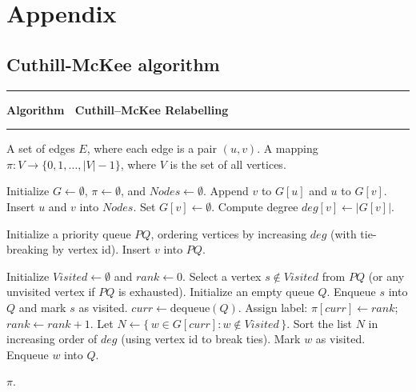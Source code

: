 \chapter{Appendix}

\section{Cuthill-McKee algorithm}\label{sec:cm}

\label{alg:cm_refactored}%

\noindent\rule{\textwidth}{0.8pt}\par
\vspace{-0.3cm}
\noindent\textbf{Algorithm \thealgorithm\ Cuthill--McKee Relabelling}\par
\vspace{-0.5cm}
\noindent\rule{\textwidth}{0.4pt}\par

\begin{algorithmic}[1]
  \Require A set of edges $E$, where each edge is a pair $(u,v)$.
  \Ensure A mapping $\pi : V \to \{0,1,\dots,|V|-1\}$, where $V$ is the set of all vertices.

  \State Initialize $G \leftarrow \emptyset$, $\pi \leftarrow \emptyset$, and $Nodes \leftarrow \emptyset$.
    \State Append $v$ to $G[u]$ and $u$ to $G[v]$.
    \State Insert $u$ and $v$ into $Nodes$.
  \EndFor
      \State Set $G[v] \leftarrow \emptyset$.  
    \EndIf
  \EndFor
    \State Compute degree $deg[v] \leftarrow |G[v]|$.
  \EndFor

  \State Initialize a priority queue $PQ$, ordering vertices by increasing $deg$ (with tie-breaking by vertex id).
    \State Insert $v$ into $PQ$.
  \EndFor

  \State Initialize $Visited \leftarrow \emptyset$ and $rank \leftarrow 0$.
    \State Select a vertex $s \notin Visited$ from $PQ$ (or any unvisited vertex if $PQ$ is exhausted).
    \State Initialize an empty queue $Q$.
    \State Enqueue $s$ into $Q$ and mark $s$ as visited.
      \State $curr \leftarrow \text{dequeue}(Q)$.
      \State Assign label: $\pi[curr] \leftarrow rank$; $rank \leftarrow rank + 1$.
      \State Let $N \leftarrow \{\, w \in G[curr] : w \notin Visited \,\}$.
      \State Sort the list $N$ in increasing order of $deg$ (using vertex id to break ties).
        \State Mark $w$ as visited.
        \State Enqueue $w$ into $Q$.
      \EndFor
    \EndWhile
  \EndWhile

  \State \Return $\pi$.
\end{algorithmic}


